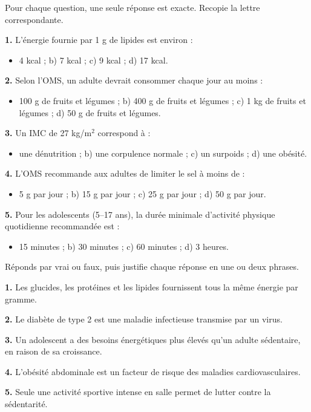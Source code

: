 \documentclass[11pt]{article}
\begin{document}
\begin{exercice}
Pour chaque question, une seule réponse est exacte. Recopie la lettre correspondante.

\textbf{1.} L'énergie fournie par 1 g de lipides est environ :
\begin{itemize}
\item[a)] 4 kcal ; \quad b) 7 kcal ; \quad c) 9 kcal ; \quad d) 17 kcal.
\end{itemize}

\textbf{2.} Selon l'OMS, un adulte devrait consommer chaque jour au moins :
\begin{itemize}
\item[a)] 100 g de fruits et légumes ; \quad b) 400 g de fruits et légumes ; \quad c) 1 kg de fruits et légumes ; \quad d) 50 g de fruits et légumes.
\end{itemize}

\textbf{3.} Un IMC de 27 kg/m$^2$ correspond à :
\begin{itemize}
\item[a)] une dénutrition ; \quad b) une corpulence normale ; \quad c) un surpoids ; \quad d) une obésité.
\end{itemize}

\textbf{4.} L'OMS recommande aux adultes de limiter le sel à moins de :
\begin{itemize}
\item[a)] 5 g par jour ; \quad b) 15 g par jour ; \quad c) 25 g par jour ; \quad d) 50 g par jour.
\end{itemize}

\textbf{5.} Pour les adolescents (5--17 ans), la durée minimale d'activité physique quotidienne recommandée est :
\begin{itemize}
\item[a)] 15 minutes ; \quad b) 30 minutes ; \quad c) 60 minutes ; \quad d) 3 heures.
\end{itemize}
\end{exercice}

\begin{exercice}
Réponds par vrai ou faux, puis justifie chaque réponse en une ou deux phrases.

\textbf{1.} Les glucides, les protéines et les lipides fournissent tous la même énergie par gramme.

\textbf{2.} Le diabète de type 2 est une maladie infectieuse transmise par un virus.

\textbf{3.} Un adolescent a des besoins énergétiques plus élevés qu'un adulte sédentaire, en raison de sa croissance.

\textbf{4.} L'obésité abdominale est un facteur de risque des maladies cardiovasculaires.

\textbf{5.} Seule une activité sportive intense en salle permet de lutter contre la sédentarité.
\end{exercice}
\end{document}
